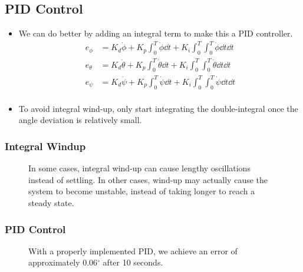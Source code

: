 \documentclass{beamer}
\begin{document}
\subsection{PID Control}
\begin{frame}
    \begin{itemize}
        \item We can do better by adding an integral term to make this a PID controller.
            \begin{align*}
                e_\phi &= K_d\dot\phi + K_p \int_0^T\dot\phi\dd t + K_i \int_0^T\int_0^T\dot\phi\dd t\dd t \\
                e_\theta &= K_d\dot\theta + K_p \int_0^T\dot\theta\dd t + K_i \int_0^T\int_0^T\dot\theta\dd t\dd t \\
                e_\psi &= K_d\dot\psi + K_p \int_0^T\dot\psi\dd t + K_i \int_0^T\int_0^T\dot\psi\dd t\dd t \\
            \end{align*}
        \item To avoid integral wind-up, only start integrating the double-integral once the angle
            deviation is relatively small.
    \end{itemize}
\end{frame}

\begin{frame}
    \frametitle{Integral Windup}
    \begin{figure}[H]
        \caption{
            In some cases, integral wind-up can cause lengthy oscillations instead of settling. In other cases,
            wind-up may actually cause the system to become unstable, instead of taking longer to reach
            a steady state.
        }
    \end{figure}
\end{frame}

\begin{frame}
    \frametitle{PID Control}
    \begin{figure}[H]
        \caption{
            With a properly implemented PID, we achieve an error of approximately 0.06$^\circ$ after 10 seconds.
        }
    \end{figure}
\end{frame}
\end{document}
